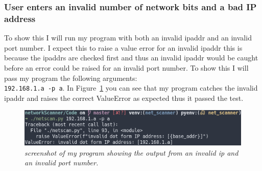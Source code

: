 \documentclass[titlepage]{article}
\let\Oldsubsubsection\subsubsection{}
\renewcommand{\subsubsection}{\FloatBarrier\Oldsubsubsection}
\begin{document}
\subsubsection{User enters an invalid number of network bits and a bad IP address}
To show this I will run my program with both an invalid \gls{ipaddr} and an
invalid port number. I expect this to raise a value error for an invalid \gls{ipaddr}
this is because the \glspl{ipaddr} are checked first and thus an invalid \gls{ipaddr}
would be caught before an error could be raised for an invalid port number.
To show this I will pass my program the following arguments: \\
\verb|192.168.1.a -p a|. In Figure~\ref{invalidipandport} you can see that
my program catches the invalid \gls{ipaddr} and raises the correct ValueError
as expected thus it passed the test.

\begin{figure}[H]
\centering
\includegraphics[width=\textwidth]{invalidipandport.png}
\caption{\textit{%
  screenshot of my program showing the output from an invalid ip and an invalid port number.
}}\label{invalidipandport}
\end{figure}
\end{document}

